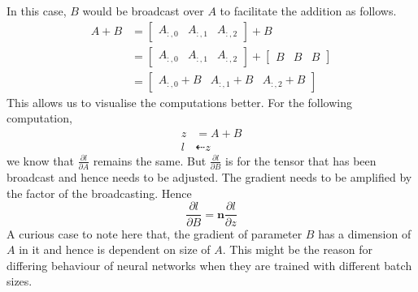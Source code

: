 \documentclass[12pt,crop=false,class=article,convert={density=300,outext=.compiled.png}]{standalone}
\begin{document}
In this case, $B$ would be broadcast over $A$ to facilitate the addition as follows. 
\begin{align*}
A+B &=\begin{bmatrix} A_{:,0} & A_{:,1} & A_{:,2} \end{bmatrix}+B 
\\&= 
\begin{bmatrix} A_{:,0} & A_{:,1} & A_{:,2} \end{bmatrix}+\begin{bmatrix} B & B & B \end{bmatrix}
\\&=
\begin{bmatrix} A_{:,0}+B & A_{:,1}+B & A_{:,2}+B \end{bmatrix}
\end{align*}
This allows us to visualise the computations better. For the following computation,  
\begin{align*}
  z &= A+B
  \\
  l &\dashleftarrow z
 \end{align*}
we know that $\frac{\partial l}{\partial A}$ remains the same. But $\frac{\partial l}{\partial B}$ is for the tensor that has been broadcast and hence needs to be adjusted. The gradient needs to be amplified by the factor of the broadcasting. Hence
$$\frac{\partial l}{\partial B} = \mathbf{n}\frac{\partial l}{\partial z}$$ 
A curious case to note here that, the gradient of parameter $B$ has a dimension of $A$ in it and hence is dependent on size of $A$. This might be the reason for differing behaviour of neural networks when they are trained with different batch sizes.  
\end{document}
